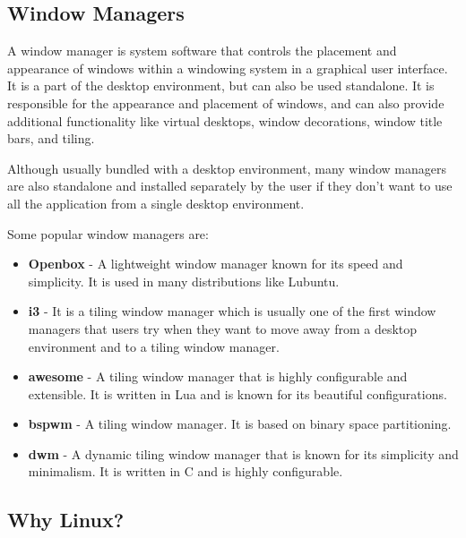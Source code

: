 \subsection{Window Managers}

\begin{definition}
  A window manager is system software that controls the placement and appearance of windows within a windowing system in a graphical user interface. It is a part of the desktop environment, but can also be used standalone. It is responsible for the appearance and placement of windows, and can also provide additional functionality like virtual desktops, window decorations, window title bars, and tiling.
\end{definition}

Although usually bundled with a desktop environment, many window managers are also standalone and installed separately by the user if they don't want to use all the application from a single desktop environment.

Some popular window managers are:

\begin{itemize}
  \item
    \textbf{Openbox} - A lightweight window manager known for its speed and simplicity. It is used in many distributions like Lubuntu.
  \item
    \textbf{i3} - It is a tiling window manager
    which is usually one of the first window managers that users try when they want to move away from a desktop environment and to a tiling window manager.
  \item \textbf{awesome} - A tiling window manager that is highly configurable and extensible. It is written in Lua and is known for its beautiful configurations.
  \item \textbf{bspwm} - A tiling window manager. It is based on binary space partitioning.
  \item \textbf{dwm} - A dynamic tiling window manager that is known for its simplicity and minimalism. It is written in C and is highly configurable.
  \end{itemize}

\subsection{Why Linux?}

